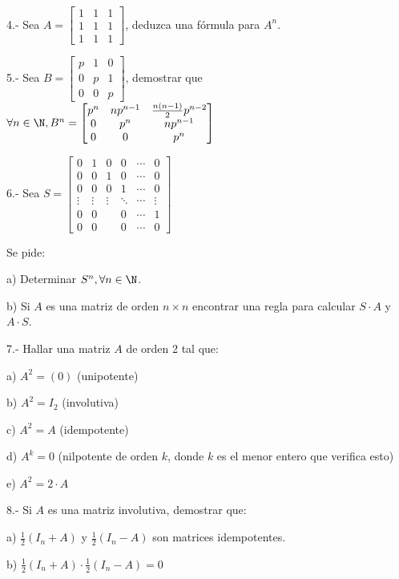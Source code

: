 4.- Sea
$ A= \begin{bmatrix}
1 & 1 & 1\\
1 & 1 & 1\\
1 & 1 & 1
\end{bmatrix}$,
deduzca una fórmula para $A^n$.

5.- Sea
$B= \begin{bmatrix}
p & 1 &  0  \\
0 & p & 1 \\
0 & 0 &  p
\end{bmatrix}$, 
demostrar que $\forall n \in \N, B^n=
\begin{bmatrix}
p^n   &    np^{n-1}  &  \frac{n(n-1)}{2}p^{n-2} \\
0        & p^n             &    n p^{n-1} \\
0        & 0                  &     p^{n}
\end{bmatrix}$

6.- Sea
$S= \begin{bmatrix}
0 & 1 & 0 &  0   & \cdots & 0  \\
0 & 0 & 1 &  0   & \cdots & 0 \\
0 & 0 & 0 & 1   & \cdots & 0 \\
\vdots & \vdots & \vdots &  \ddots   & \cdots & \vdots \\
0 & 0 &  &  0   & \cdots & 1 \\
0 & 0 &  &  0   & \cdots & 0
\end{bmatrix}$

Se pide:

a) Determinar $S^n, \forall n \in \N$.

b) Si $A$ es una matriz de orden $n \times n$ encontrar una regla para calcular $S \cdot A$ y $A \cdot  S$.


7.- Hallar una matriz $A$ de orden 2 tal que: 

a) $A^2= (0)$ (unipotente)

b) $A^2= I_2$ (involutiva)

c) $A^2= A$ (idempotente)

d) $A^k= 0$ (nilpotente de orden $k$, donde $k$ es el menor entero que verifica esto)

e) $ A^2=2 \cdot A$

8.- Si $A$ es una matriz involutiva, demostrar que:

a) $\frac{1}{2} (I_n + A)$ y  $\frac{1}{2} (I_n - A)$ son matrices idempotentes.

b) $\frac{1}{2} (I_n + A) \cdot \frac{1}{2} (I_n - A) = 0$ 

